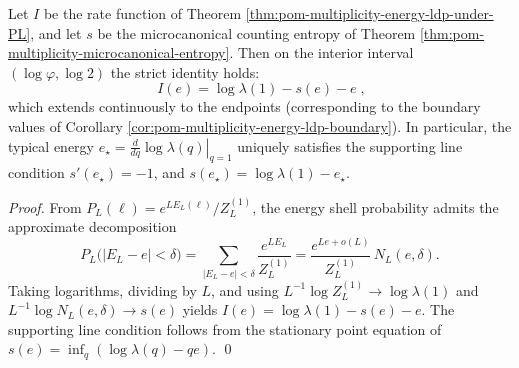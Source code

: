 \begin{corollary}\label{cor:pom-multiplicity-gibbs-identity}
Let \(I\) be the rate function of Theorem \ref{thm:pom-multiplicity-energy-ldp-under-PL}, and let \(s\) be the microcanonical counting entropy of Theorem \ref{thm:pom-multiplicity-microcanonical-entropy}.
Then on the interior interval \((\log\varphi,\log 2)\) the strict identity holds:
\[
\boxed{\;
I(e)=\log\lambda(1)-s(e)-e\; } ,
\]
which extends continuously to the endpoints (corresponding to the boundary values of Corollary \ref{cor:pom-multiplicity-energy-ldp-boundary}).
In particular, the typical energy
\(
e_\star=\left.\frac{d}{dq}\log\lambda(q)\right|_{q=1}
\)
uniquely satisfies the supporting line condition
\(
s'(e_\star)=-1
\), and
\(
s(e_\star)=\log\lambda(1)-e_\star
\).
\end{corollary}
\begin{proof}
From \(P_L(\boldsymbol{\ell})=e^{LE_L(\boldsymbol{\ell})}/Z_L^{(1)}\), the energy shell probability admits the approximate decomposition
\[
P_L\bigl(|E_L-e|<\delta\bigr)
=\sum_{|E_L-e|<\delta}\frac{e^{LE_L}}{Z_L^{(1)}}
=\frac{e^{Le+o(L)}}{Z_L^{(1)}}\,N_L(e,\delta).
\]
Taking logarithms, dividing by \(L\), and using \(L^{-1}\log Z_L^{(1)}\to\log\lambda(1)\) and \(L^{-1}\log N_L(e,\delta)\to s(e)\) yields
\(
I(e)=\log\lambda(1)-s(e)-e
\).
The supporting line condition follows from the stationary point equation of \(s(e)=\inf_q(\log\lambda(q)-q e)\). \qed
\end{proof}

